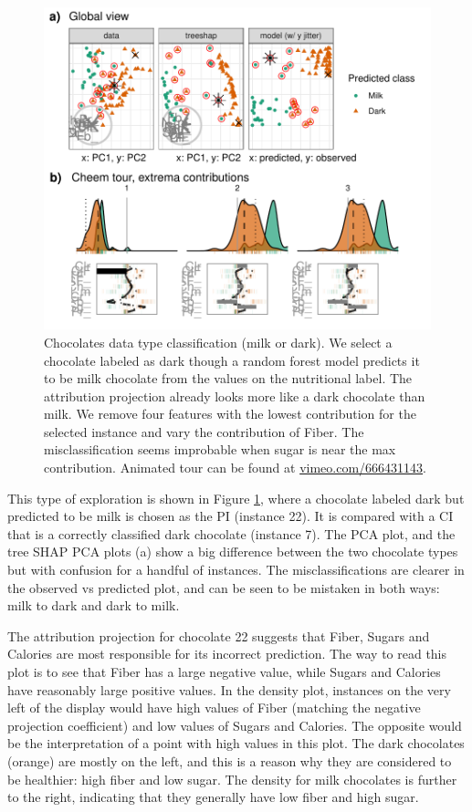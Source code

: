 \documentclass[
]{article}
\begin{document}
\begin{figure}

{\centering \includegraphics[width=1\linewidth]{./figures/case_chocolates} 

}

\caption{Chocolates data type classification (milk or dark). We select a chocolate labeled as dark though a random forest model predicts it to be milk chocolate from the values on the nutritional label. The attribution projection already looks more like a dark chocolate than milk. We remove four features with the lowest contribution for the selected instance and vary the contribution of Fiber. The misclassification seems improbable when sugar is near the max contribution. Animated tour can be found at \href{https://vimeo.com/666431143}{vimeo.com/666431143}.}\label{fig:casechocolates}
\end{figure}

This type of exploration is shown in Figure \ref{fig:casechocolates}, where a chocolate labeled dark but predicted to be milk is chosen as the PI (instance 22). It is compared with a CI that is a correctly classified dark chocolate (instance 7). The PCA plot, and the tree SHAP PCA plots (a) show a big difference between the two chocolate types but with confusion for a handful of instances. The misclassifications are clearer in the observed vs predicted plot, and can be seen to be mistaken in both ways: milk to dark and dark to milk.

The attribution projection for chocolate 22 suggests that Fiber, Sugars and Calories are most responsible for its incorrect prediction. The way to read this plot is to see that Fiber has a large negative value, while Sugars and Calories have reasonably large positive values. In the density plot, instances on the very left of the display would have high values of Fiber (matching the negative projection coefficient) and low values of Sugars and Calories. The opposite would be the interpretation of a point with high values in this plot. The dark chocolates (orange) are mostly on the left, and this is a reason why they are considered to be healthier: high fiber and low sugar. The density for milk chocolates is further to the right, indicating that they generally have low fiber and high sugar.
\end{document}
